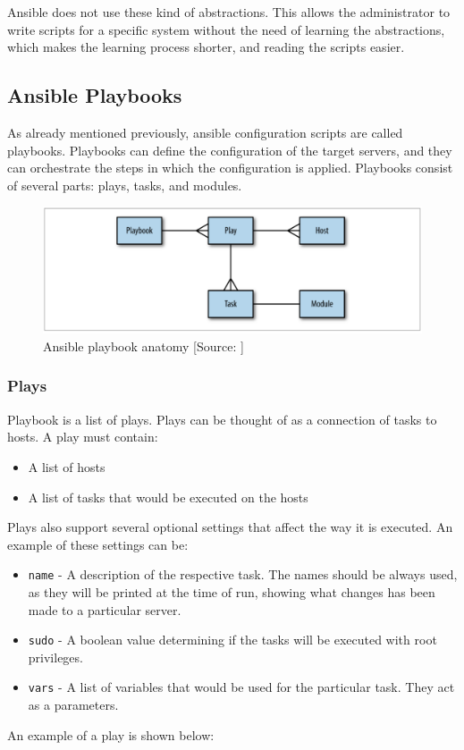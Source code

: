 Ansible does not use these kind of abstractions. This allows the administrator to write scripts for a specific system without the need of learning the abstractions, which makes the learning process shorter, and reading the scripts easier. \cite{UpAndRunning}




\subsection{Ansible Playbooks}
As already mentioned previously, ansible configuration scripts are called playbooks. Playbooks can define the configuration of the target servers, and they can orchestrate the steps in which the configuration is applied. Playbooks consist of several parts: plays, tasks, and modules. \cite{UpAndRunning} \cite{AnsibleDoc}

\begin{figure}[!h]
  \includegraphics[width=\textwidth]{fig/playbook_anatomy.png}
  \caption{Ansible playbook anatomy [Source: \cite{UpAndRunning}]}
  \label{fig:playbook_anatomy}
\end{figure}

\subsubsection*{Plays}

Playbook is a list of plays. Plays can be thought of as a connection of tasks to hosts. A play must contain:
\begin{itemize}
  \item{A list of hosts}
  \item{A list of tasks that would be executed on the hosts}
\end{itemize}
Plays also support several optional settings that affect the way it is executed. An example of these settings can be:
\begin{itemize}
  \item{\texttt{name} - A description of the respective task. The names should be always used, as they will be printed} at the time of run, showing what changes has been made to a particular server.
  \item{\texttt{sudo} - A boolean value determining if the tasks will be executed with root privileges.}
  \item{\texttt{vars} - A list of variables that would be used for the particular task. They act as a parameters.}
\end{itemize}
An example of a play is shown below:

